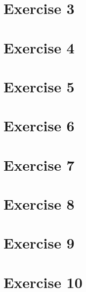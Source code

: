 \documentclass[12pt]{article}
\newcommand{\desc}[1]{\textit{#1} \vspace{1em}}
\begin{document}
\clearpage
\section*{Exercise 3}
\desc{}

\clearpage
\section*{Exercise 4}
\desc{}

\clearpage
\section*{Exercise 5}
\desc{}

\clearpage
\section*{Exercise 6}
\desc{}

\clearpage
\section*{Exercise 7}
\desc{}

\clearpage
\section*{Exercise 8}
\desc{}

\clearpage
\section*{Exercise 9}
\desc{}

\clearpage
\section*{Exercise 10}
\desc{}

\clearpage
\end{document}
